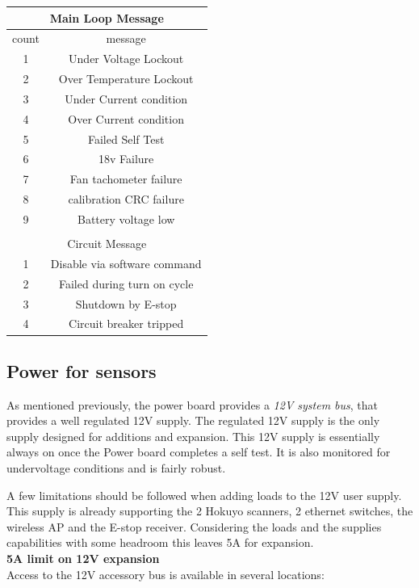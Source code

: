 \begin{tabular}{c|c|}
\hline
\multicolumn{2}{|c|}{Main Loop Message} \\
\hline
count &  message \\
\hline
\hline
1 & Under Voltage Lockout \\
\hline
2 & Over Temperature Lockout \\
\hline
3 & Under Current condition \\
\hline
4 & Over Current condition \\
\hline
5 & Failed Self Test \\
\hline
6 & 18v Failure \\
\hline
7 & Fan tachometer failure \\
\hline
8 & calibration CRC failure \\
\hline
9 & Battery voltage low  \\
\hline
& \\
\hline
\multicolumn{2}{|c|}{Circuit Message} \\
\hline
1 & Disable via software command \\
\hline
2 & Failed during turn on cycle \\
\hline
3 & Shutdown by E-stop \\
\hline
4 & Circuit breaker tripped  \\
\hline
\end{tabular}

\subsection{Power for sensors}
As mentioned previously, the power board provides a \emph{12V system bus}, that
provides a well regulated 12V supply. The regulated 12V supply is the only
supply designed for additions and expansion. This 12V supply is essentially
always on once the Power board completes a self test. It is also monitored for
undervoltage conditions and is fairly robust.

A few limitations should be followed when adding loads to the 12V user
supply. This supply is already supporting the 2 Hokuyo scanners, 2 ethernet
switches, the wireless AP and the E-stop receiver. Considering the loads and the
supplies capabilities with some headroom this leaves 5A for expansion.\\

{\bf 5A limit on 12V expansion}\\

Access to the 12V accessory bus is available in several locations:\\


